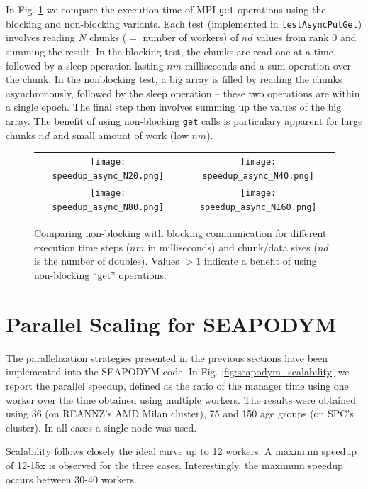 \documentclass[a4paper,oneside,12pt]{article}
\begin{document}
In Fig. \ref{fig:async} we compare the  execution time of MPI \verb|get| operations using 
the blocking and non-blocking variants. Each test (implemented in \verb|testAsyncPutGet|) involves reading $N$ chunks ($=$ number of workers) 
of $nd$ values from rank 0 and summing the result. In the blocking test, the chunks are read one at a 
time, followed by a sleep operation lasting $nm$ milliseconds and a sum operation over the chunk. 
In the nonblocking test, a big array is filled by reading the chunks asynchronously, followed by the 
sleep operation -- these two operations are within a single epoch. The final step then involves summing up the values
of the big array. The benefit of using non-blocking \verb|get| calls is particulary apparent for large chunks 
$nd$ and small amount of work (low $nm$).

\begin{figure}
\begin{tabular}{cc}
      \texttt{[image: speedup\_async\_N20.png]} & \texttt{[image: speedup\_async\_N40.png]} \\
      \texttt{[image: speedup\_async\_N80.png]} & \texttt{[image: speedup\_async\_N160.png]} \\
\end{tabular}
\caption{Comparing non-blocking with blocking communication for different execution time steps ($nm$ in milliseconds) 
and chunk/data sizes ($nd$ is the number of doubles). Values $> 1$ indicate a benefit of using non-blocking ``get'' operations.}
\label{fig:async}
\end{figure}

\section{Parallel Scaling for SEAPODYM}

The parallelization strategies presented in the previous sections have been implemented into the SEAPODYM code. 
In Fig. \ref{fig:seapodym_scalability} we report the parallel speedup, defined as the ratio of the 
manager time using one worker over the time obtained using multiple workers. The results were obtained using 36 (on REANNZ's AMD Milan cluster), 
75 and 150 age groups (on SPC's cluster). In all cases a single node was used. 

Scalability follows closely the ideal curve up to 12 workers. A maximum speedup of 12-15x is observed for the three cases. Interestingly, the
maximum speedup occurs between 30-40 workers. 
\end{document}
